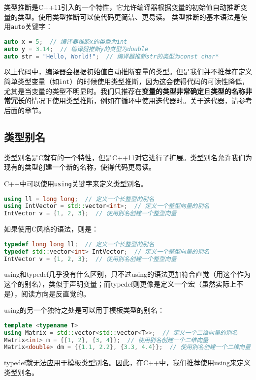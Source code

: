 \documentclass[../main.tex]{subfiles}
\begin{document}
类型推断是C++11引入的一个特性，它允许编译器根据变量的初始值自动推断变量的类型。使用类型推断可以使代码更简洁、更易读。
类型推断的基本语法是使用\texttt{auto}关键字：
\begin{lstlisting}[language=C++]
auto x = 5;  // 编译器推断x的类型为int
auto y = 3.14;  // 编译器推断y的类型为double
auto str = "Hello, World!";  // 编译器推断str的类型为const char*
\end{lstlisting}
以上代码中，编译器会根据初始值自动推断变量的类型。但是我们并不推荐在定义简单类型变量（如\texttt{int}）的时候使用类型推断，因为这会使得代码的可读性降低，尤其是当变量的类型不明显时。我们只推荐在\textbf{变量的类型非常确定}且\textbf{类型的名称非常冗长}的情况下使用类型推断，例如在循环中使用迭代器时。关于迭代器，请参考后面的章节。

\subsection{类型别名}

类型别名是C就有的一个特性，但是C++11对它进行了扩展。类型别名允许我们为现有的类型创建一个新的名称，使得代码更易读。

C++中可以使用\texttt{using}关键字来定义类型别名。
\begin{lstlisting}[language=C++]
using ll = long long;  // 定义一个长整型的别名
using IntVector = std::vector<int>;  // 定义一个整型向量的别名
IntVector v = {1, 2, 3};  // 使用别名创建一个整型向量
\end{lstlisting}

如果使用C风格的语法，则是：
\begin{lstlisting}[language=C++]
typedef long long ll;  // 定义一个长整型的别名
typedef std::vector<int> IntVector;  // 定义一个整型向量的别名
IntVector v = {1, 2, 3};  // 使用别名创建一个整型向量
\end{lstlisting}

using和typedef几乎没有什么区别，只不过using的语法更加符合直觉（用这个作为这个的别名），类似于声明变量；而typedef则更像是定义一个宏（虽然实际上不是），阅读方向是反直觉的。

using的另一个独特之处是可以用于模板类型的别名：
\begin{lstlisting}[language=C++]
template <typename T>
using Matrix = std::vector<std::vector<T>>;  // 定义一个二维向量的别名
Matrix<int> m = {{1, 2}, {3, 4}};  // 使用别名创建一个二维向量
Matrix<double> dm = {{1.1, 2.2}, {3.3, 4.4}};  // 使用别名创建一个二维向量
\end{lstlisting}
typedef就无法应用于模板类型别名。因此，在C++中，我们推荐使用using来定义类型别名。
\end{document}
